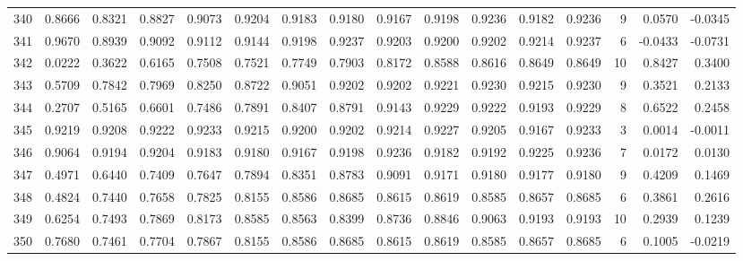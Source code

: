 \begin{tabular}{lrrrrrrrrrrrrrrr}
340 &      0.8666 &  0.8321 &  0.8827 &  0.9073 &  0.9204 &  0.9183 &  0.9180 &  0.9167 &  0.9198 &  0.9236 &   0.9182 &     0.9236 &      9 &                    0.0570 &                    -0.0345 \\
341 &      0.9670 &  0.8939 &  0.9092 &  0.9112 &  0.9144 &  0.9198 &  0.9237 &  0.9203 &  0.9200 &  0.9202 &   0.9214 &     0.9237 &      6 &                   -0.0433 &                    -0.0731 \\
342 &      0.0222 &  0.3622 &  0.6165 &  0.7508 &  0.7521 &  0.7749 &  0.7903 &  0.8172 &  0.8588 &  0.8616 &   0.8649 &     0.8649 &     10 &                    0.8427 &                     0.3400 \\
343 &      0.5709 &  0.7842 &  0.7969 &  0.8250 &  0.8722 &  0.9051 &  0.9202 &  0.9202 &  0.9221 &  0.9230 &   0.9215 &     0.9230 &      9 &                    0.3521 &                     0.2133 \\
344 &      0.2707 &  0.5165 &  0.6601 &  0.7486 &  0.7891 &  0.8407 &  0.8791 &  0.9143 &  0.9229 &  0.9222 &   0.9193 &     0.9229 &      8 &                    0.6522 &                     0.2458 \\
345 &      0.9219 &  0.9208 &  0.9222 &  0.9233 &  0.9215 &  0.9200 &  0.9202 &  0.9214 &  0.9227 &  0.9205 &   0.9167 &     0.9233 &      3 &                    0.0014 &                    -0.0011 \\
346 &      0.9064 &  0.9194 &  0.9204 &  0.9183 &  0.9180 &  0.9167 &  0.9198 &  0.9236 &  0.9182 &  0.9192 &   0.9225 &     0.9236 &      7 &                    0.0172 &                     0.0130 \\
347 &      0.4971 &  0.6440 &  0.7409 &  0.7647 &  0.7894 &  0.8351 &  0.8783 &  0.9091 &  0.9171 &  0.9180 &   0.9177 &     0.9180 &      9 &                    0.4209 &                     0.1469 \\
348 &      0.4824 &  0.7440 &  0.7658 &  0.7825 &  0.8155 &  0.8586 &  0.8685 &  0.8615 &  0.8619 &  0.8585 &   0.8657 &     0.8685 &      6 &                    0.3861 &                     0.2616 \\
349 &      0.6254 &  0.7493 &  0.7869 &  0.8173 &  0.8585 &  0.8563 &  0.8399 &  0.8736 &  0.8846 &  0.9063 &   0.9193 &     0.9193 &     10 &                    0.2939 &                     0.1239 \\
350 &      0.7680 &  0.7461 &  0.7704 &  0.7867 &  0.8155 &  0.8586 &  0.8685 &  0.8615 &  0.8619 &  0.8585 &   0.8657 &     0.8685 &      6 &                    0.1005 &                    -0.0219 \\

\end{tabular}
